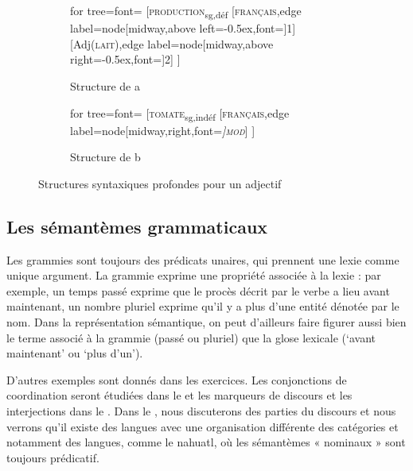 \begin{figure}
	\begin{subfigure}[b]{0.5\textwidth}
		\centering
		\begin{forest} for tree={font=\normalfont}
			[\textsc{production}\textsubscript{sg,déf}
			[\textsc{français},edge label={node[midway,above left=-0.5ex,font=\footnotesize]{1}}]
			[Adj(\textsc{lait}),edge label={node[midway,above right=-0.5ex,font=\footnotesize]{2}}]
			]
		\end{forest}
		\caption{Structure de a}
	\end{subfigure}%
	\hfill
	\begin{subfigure}[b]{0.5\textwidth}
		\centering
		\begin{forest} for tree={font=\normalfont}
			[\textsc{tomate}\textsubscript{sg,indéf}
			[\textsc{français},edge label={node[midway,right,font=\footnotesize\itshape]{\textsc{mod}}}]
			]
		\end{forest}
		\caption{Structure de b}
	\end{subfigure}
\caption{Structures syntaxiques profondes pour un adjectif\label{fig:13-francais}}
\end{figure}

\subsection{Les sémantèmes grammaticaux} 
Les grammies sont toujours des prédicats unaires, qui prennent une lexie comme unique argument. La grammie exprime une propriété associée à la lexie : par exemple, un temps passé exprime que le procès décrit par le verbe a lieu avant maintenant, un nombre pluriel exprime qu’il y a plus d’une entité dénotée par le nom. Dans la représentation sémantique, on peut d’ailleurs faire figurer aussi bien le terme associé à la grammie (passé ou pluriel) que la glose lexicale (‘avant maintenant’ ou ‘plus d’un’).

D’autres exemples sont donnés dans les exercices. Les conjonctions de coordination seront étudiées dans le  et les marqueurs de discours et les interjections dans le . Dans le , nous discuterons des parties du discours et nous verrons qu’il existe des langues avec une organisation différente des catégories et notamment des langues, comme le nahuatl, où les sémantèmes « nominaux » sont toujours prédicatif.

